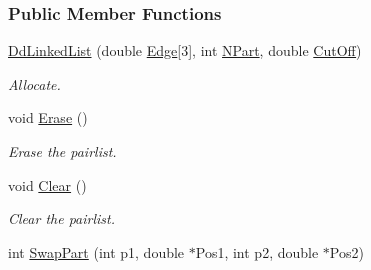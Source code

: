\subsubsection*{\-Public \-Member \-Functions}
\begin{DoxyCompactItemize}
\item 
\hyperlink{classDdLinkedList_aaf16124b5aa0b2a6597b9363f1a1c247}{\-Dd\-Linked\-List} (double \hyperlink{classDomDecBasics_a8895c89605e91c6cf7430bad336f77c6}{\-Edge}\mbox{[}3\mbox{]}, int \hyperlink{classDomDecBasics_abdcc792391d8c5092471dff191de47f4}{\-N\-Part}, double \hyperlink{classDomDecBasics_af2411aba2dd63fa22b1bc279653ff7a0}{\-Cut\-Off})
\begin{DoxyCompactList}\small\item\em \-Allocate. \end{DoxyCompactList}\item 
void \hyperlink{classDdLinkedList_a98ae2e78109ea826eea71da14c37ce95}{\-Erase} ()
\begin{DoxyCompactList}\small\item\em \-Erase the pairlist. \end{DoxyCompactList}\item 
\hypertarget{classDdLinkedList_aa71d36872f416feaa853788a7a7a7ef8}{void \hyperlink{classDdLinkedList_aa71d36872f416feaa853788a7a7a7ef8}{\-Clear} ()}\label{classDdLinkedList_aa71d36872f416feaa853788a7a7a7ef8}

\begin{DoxyCompactList}\small\item\em \-Clear the pairlist. \end{DoxyCompactList}\item 
\hypertarget{classDdLinkedList_ae468af31d1a530ba0fdaef088c4b9c00}{int \hyperlink{classDdLinkedList_ae468af31d1a530ba0fdaef088c4b9c00}{\-Swap\-Part} (int p1, double $\ast$\-Pos1, int p2, double $\ast$\-Pos2)}\label{classDdLinkedList_ae468af31d1a530ba0fdaef088c4b9c00}


\end{DoxyCompactItemize}
